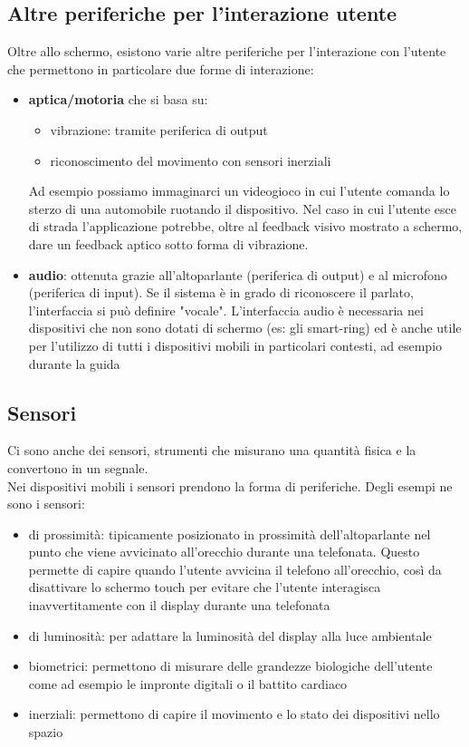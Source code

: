 \subsection{Altre periferiche per l'interazione utente}
Oltre allo schermo, esistono varie altre periferiche per l’interazione con l’utente
che permettono in particolare due forme di interazione: 
\begin{itemize}
    \item \textbf{aptica/motoria} che si basa su: 
        \begin{itemize}
            \item vibrazione: tramite periferica di output
            \item riconoscimento del movimento con sensori inerziali
        \end{itemize}
        Ad esempio possiamo immaginarci un videogioco in cui l’utente comanda lo sterzo di una automobile ruotando il dispositivo.
        Nel caso in cui l’utente esce di strada l’applicazione potrebbe, oltre al feedback visivo mostrato a schermo, dare un feedback aptico sotto forma di vibrazione.
    \item \textbf{audio}: ottenuta grazie all'altoparlante (periferica di output) e al microfono (periferica di input).
    Se il sistema è in grado di riconoscere il parlato, l’interfaccia si può definire "vocale".
    L'interfaccia audio è necessaria nei dispositivi che non
    sono dotati di schermo (es: gli smart-ring) ed è anche utile per l’utilizzo di tutti i dispositivi mobili in particolari contesti, ad esempio durante la guida
\end{itemize}

\subsection{Sensori}
Ci sono anche dei sensori, strumenti che misurano una quantità fisica e la convertono in un segnale. 
\\ Nei dispositivi mobili i sensori prendono la forma di periferiche.
Degli esempi ne sono i sensori:
\begin{itemize}
    \item di prossimità: tipicamente posizionato in prossimità dell'altoparlante nel punto che viene avvicinato all'orecchio durante una telefonata. Questo permette di capire quando l'utente avvicina il telefono all'orecchio, così da disattivare lo schermo touch per evitare che l'utente interagisca inavvertitamente con il display durante una telefonata
    \item di luminosità: per adattare la luminosità del display alla luce ambientale
    \item biometrici: permettono di misurare delle grandezze biologiche dell'utente come ad esempio le impronte digitali o il battito cardiaco
    \item inerziali: permettono di capire il movimento e lo stato dei dispositivi nello spazio
\end{itemize}

